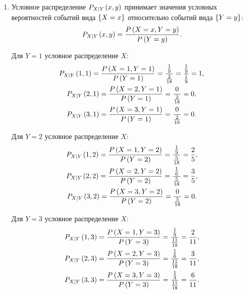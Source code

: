 \begin{enumerate}
    \item Условное распределение $P_{X \left | Y \right .}(x,y)$ принимает значения условных вероятностей событий вида $\left \{ X=x \right \}$ относительно событий вида $\left \{ Y=y \right \}$:
    \begin{equation}
        P_{X \left | Y \right .}(x,y) = \frac{P \left ( X=x, Y=y \right )}{P \left ( Y=y \right )} .
    \end{equation}

    Для $Y=1$ условное распределение $X$:
    \begin{gather}
        P_{X \left | Y \right .}(1,1)
        = \frac{P \left ( X=1, Y=1 \right )}{P \left ( Y=1 \right )}
        = \frac{\frac{1}{9}}{\frac{2}{18}}
        = \frac{\frac{1}{9}}{\frac{1}{9}}
        = 1 , \\
        P_{X \left | Y \right .}(2,1)
        = \frac{P \left ( X=2, Y=1 \right )}{P \left ( Y=1 \right )}
        = \frac{0}{\frac{2}{18}}
        = 0 , \\
        P_{X \left | Y \right .}(3,1)
        = \frac{P \left ( X=3, Y=1 \right )}{P \left ( Y=1 \right )}
        = \frac{0}{\frac{2}{18}}
        = 0 .
    \end{gather}

    Для $Y=2$ условное распределение $X$:
    \begin{gather}
        P_{X \left | Y \right .}(1,2)
        = \frac{P \left ( X=1, Y=2 \right )}{P \left ( Y=2 \right )}
        = \frac{\frac{1}{9}}{\frac{5}{18}}
        = \frac{2}{5} , \\
        P_{X \left | Y \right .}(2,2)
        = \frac{P \left ( X=2, Y=2 \right )}{P \left ( Y=2 \right )}
        = \frac{\frac{1}{6}}{\frac{5}{18}}
        = \frac{3}{5} , \\
        P_{X \left | Y \right .}(3,2)
        = \frac{P \left ( X=3, Y=2 \right )}{P \left ( Y=2 \right )}
        = \frac{0}{\frac{5}{18}}
        = 0 .
    \end{gather}

    Для $Y=3$ условное распределение $X$:
    \begin{gather}
        P_{X \left | Y \right .}(1,3)
        = \frac{P \left ( X=1, Y=3 \right )}{P \left ( Y=3 \right )}
        = \frac{\frac{1}{9}}{\frac{11}{18}}
        = \frac{2}{11} , \\
        P_{X \left | Y \right .}(2,3)
        = \frac{P \left ( X=2, Y=3 \right )}{P \left ( Y=3 \right )}
        = \frac{\frac{1}{6}}{\frac{11}{18}}
        = \frac{3}{11} , \\
        P_{X \left | Y \right .}(3,3)
        = \frac{P \left ( X=3,Y=3 \right )}{P \left ( Y=3 \right )}
        = \frac{\frac{1}{3}}{\frac{11}{18}}
        = \frac{6}{11} .
    \end{gather}


\end{enumerate}

